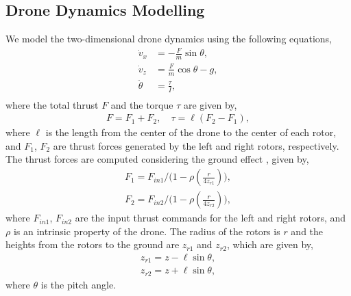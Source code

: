 \subsection{Drone Dynamics Modelling}\label{drone_dynamics_modelling}
We model the two-dimensional drone dynamics using the following equations,
\begin{subequations}\label{eqn:DroneDynamics}
\begin{align} 
\dot{v}_{x} &= -\frac{F}{m}\sin{\theta}, \\ 
\dot{v}_{z}&= \frac{F}{m}\cos{\theta} - g,\\
\ddot{\theta} &= \frac{\tau}{I},\\
\end{align}
\end{subequations}
where the total thrust $F$ and the torque $\tau$ are given by,
\begin{align}
    F = F_1 + F_2, \quad \tau = \ell(F_2 - F_1),
\end{align}
where $\ell$ is the length from the center of the drone to the center of each rotor, and $F_1$, $F_2$ are thrust forces generated by the left and right rotors, respectively. The thrust forces are computed considering the ground effect \cite{ground_effect_book}, given by,
\begin{align}
    F_1 = F_{in1}/\bigl(1-\rho(\frac{r}{4z_{r1}})\bigr), \\
    F_2 = F_{in2}/\bigl(1-\rho(\frac{r}{4z_{r2}})\bigr),
\end{align}
where $F_{in1}$, $F_{in2}$ are the input thrust commands for the left and right rotors, and $\rho$ is an intrinsic property of the drone. The radius of the rotors is $r$ and the heights from the rotors to the ground are $z_{r1}$ and $z_{r2}$, which are given by,
\begin{align}
    z_{r1} = z - \ell\sin{\theta},\\
    z_{r2} = z + \ell\sin{\theta},
\end{align}
where $\theta$ is the pitch angle.
